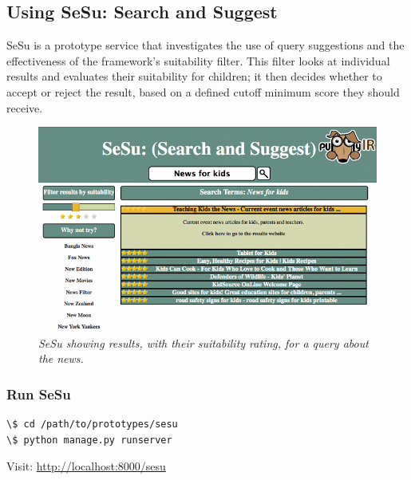\documentclass[letterpaper,10pt,english]{sphinxmanual}
\begin{document}
\subsection{Using SeSu: Search and Suggest}
\label{prototypes:using-sesu-search-and-suggest}
SeSu is a prototype service that investigates the use of query suggestions and the effectiveness of the framework's suitability filter. This filter looks at individual results and evaluates their suitability for children; it then decides whether to accept or reject the result, based on a defined cutoff minimum score they should receive.
\begin{figure}[htbp]
\centering
\capstart

\includegraphics{puppy-sesu.png}
\caption{\emph{SeSu showing results, with their suitability rating, for a query about the news.}}\end{figure}


\subsubsection{Run SeSu}
\label{prototypes:run-sesu}
\begin{Verbatim}[commandchars=\\\{\}]
\$ cd /path/to/prototypes/sesu
\$ python manage.py runserver
\end{Verbatim}

Visit: \href{http://localhost:8000/sesu}{http://localhost:8000/sesu}
\end{document}
